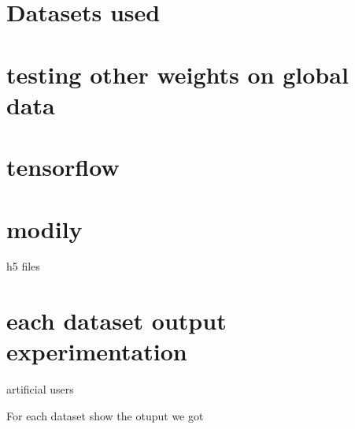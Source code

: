 \documentclass[10pt]{article}
\begin{document}
\section{Datasets used}

\clearpage
\section{testing other weights on global data}

\clearpage
\section{tensorflow}

\clearpage
\section{modily}
h5 files
\clearpage
\section{each dataset output experimentation}
artificial users

For each dataset show the otuput we got

\clearpage
\printbibliography[title={Bibliography}]
\end{document}
